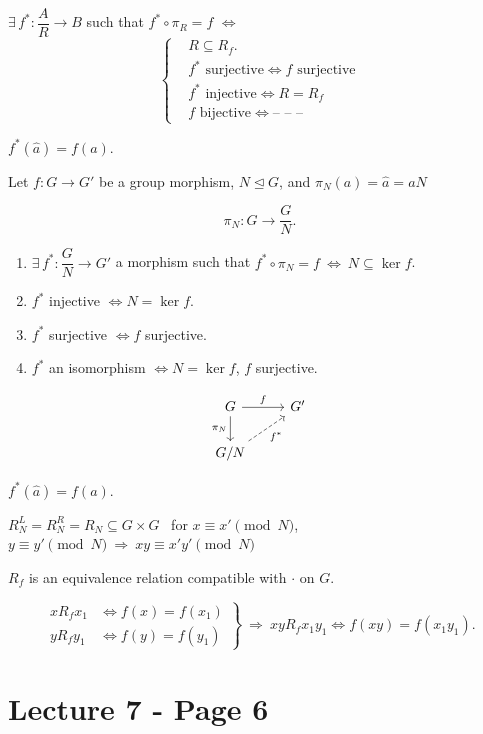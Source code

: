 \bigskip
\noindent $\exists\,f^*: \dfrac{A}{R} \to B$ such that $f^*\circ\pi_R = f$ $\Leftrightarrow$
\[
\left\{\begin{aligned}
&R\subseteq R_f.\\
&f^*\text{ surjective} \Leftrightarrow f \text{ surjective}\\
&f^*\text{ injective} \Leftrightarrow R=R_f\\
&f \text{ bijective} \Leftrightarrow \text{-- -- --}
\end{aligned}\right.
\]

\noindent $f^*(\hat a) = f(a)$.

\bigskip
\noindent Let $f:G\to G'$ be a group morphism, $N\trianglelefteq G$, and $\pi_N(a) = \hat a = aN$

\[
\pi_N: G \to \dfrac{G}{N}.
\]

\begin{enumerate}
\item[(1)] $\exists\,f^*: \dfrac{G}{N}\to G'$ a morphism such that $f^*\circ\pi_N = f \ \Leftrightarrow \ N\subseteq\ker f$.
\item[(2)] $f^*$ injective $\Leftrightarrow N=\ker f$.
\item[(3)] $f^*$ surjective $\Leftrightarrow f$ surjective.
\item[(4)] $f^*$ an isomorphism $\Leftrightarrow N=\ker f$, $f$ surjective.
\end{enumerate}

\[
\begin{tikzcd}
G \arrow[r,"f"] \arrow[d,"\pi_N"'] & G' \\
G/N \arrow[ur, dashed,"f^*"'] &
\end{tikzcd}
\]

\noindent $f^*(\hat a) = f(a)$.

\bigskip
\noindent $R_N^L = R_N^R = R_N \subseteq G\times G$ \ for $x\equiv x' \pmod N$, $y\equiv y' \pmod N \ \Rightarrow \ xy\equiv x'y' \pmod N$

\bigskip
\noindent $R_f$ is an equivalence relation compatible with $\cdot$ on $G$.

\[
\left.\begin{aligned}
xR_fx_1 &\Leftrightarrow f(x)=f(x_1)\\
yR_fy_1 &\Leftrightarrow f(y)=f(y_1)
\end{aligned}\right\} \ \Rightarrow \ xyR_fx_1y_1 \Leftrightarrow f(xy)=f(x_1y_1).
\]



\section*{Lecture 7 - Page 6}

